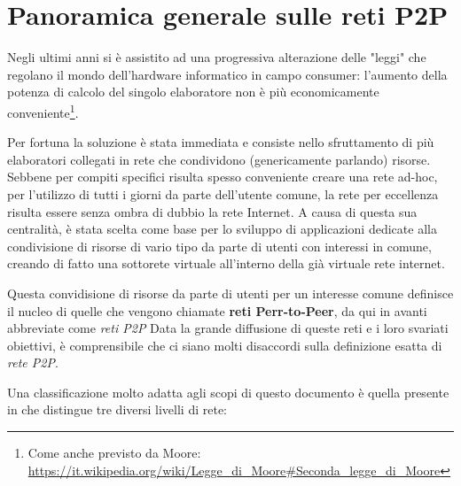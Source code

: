 \chapter{Panoramica generale sulle reti P2P}\label{panoramica-generale-sulle-reti-p2p}

Negli ultimi anni si è assistito ad una progressiva alterazione delle "leggi" che regolano il mondo dell'hardware informatico in campo consumer: l'aumento della potenza di calcolo del singolo elaboratore non è più economicamente conveniente\footnote{Come anche previsto da Moore: \url{https://it.wikipedia.org/wiki/Legge_di_Moore\#Seconda_legge_di_Moore}}.

Per fortuna la soluzione è stata immediata e consiste nello sfruttamento di più elaboratori collegati in rete che condividono (genericamente parlando) risorse. Sebbene per compiti specifici risulta spesso conveniente creare una rete ad-hoc, per l'utilizzo di tutti i giorni da parte dell'utente comune, la rete per eccellenza risulta essere senza ombra di dubbio la rete Internet. A causa di questa sua centralità, è stata scelta come base per lo sviluppo di applicazioni dedicate alla condivisione di risorse di vario tipo da parte di utenti con interessi in comune, creando di fatto una sottorete virtuale all'interno della già virtuale rete internet.

Questa convidisione di risorse da parte di utenti per un interesse comune definisce il nucleo di quelle che vengono chiamate \textbf{reti Perr-to-Peer}, da qui in avanti abbreviate come \emph{reti P2P} Data la grande diffusione di queste reti e i loro svariati obiettivi, è comprensibile che ci siano molti disaccordi sulla definizione esatta di \emph{rete P2P}.

Una classificazione molto adatta agli scopi di questo documento è quella presente in \cite{core-concepts-p2p} che distingue tre diversi livelli di rete:

